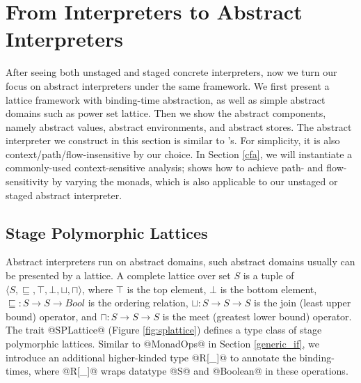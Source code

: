 \section{From Interpreters to Abstract Interpreters} \label{unstaged_abs}

After seeing both unstaged and staged concrete interpreters, now we turn our
focus on abstract interpreters under the same framework. We first present a
lattice framework with binding-time abstraction, as well as simple abstract
domains such as power set lattice.
Then we show the abstract components, namely abstract values, abstract
environments, and abstract stores.
The abstract interpreter we construct in this
section is similar to \citet{DBLP:journals/pacmpl/DaraisLNH17}'s. For
simplicity, it is also context/path/flow-insensitive by our choice. In Section
\ref{cfa}, we will instantiate a commonly-used context-sensitive analysis;
\citet{Darais:2015:GTM:2814270.2814308} shows how to achieve path- and
flow-sensitivity by varying the monads, which is also applicable to our unstaged
or staged abstract interpreter.

\iffalse
For example, the CEK machine \cite{DBLP:conf/popl/FelleisenF87} for
concrete execution can be readily refactored to an effective $0$-CFA
control-flow analysis \cite{Shivers:1988:CFA:53990.54007,
  Midtgaard:2012:CAF:2187671.2187672}: first, tweak the environment
dereference as a nondeterministic choice, such that the environment
may contain multiple possible values for a variable, then allocate
continuations in the environment to exploit return-flow information,
and also constrain the address space to be finite.
\fi

\subsection{Stage Polymorphic Lattices} \label{stagedpoly_lat}

Abstract interpreters run on abstract domains, such abstract domains usually can
be presented by a lattice.
A complete lattice over set $S$ is a tuple of $\langle S, \sqsubseteq, \top,
\bot, \sqcup, \sqcap \rangle$, where $\top$ is the top element, $\bot$ is the
bottom element, $\sqsubseteq : S \to S \to Bool$ is the
ordering relation, $\sqcup: S \to S \to S$ is the join (least upper bound)
operator, and $\sqcap: S \to S \to S$ is the meet (greatest lower bound)
operator. The trait @SPLattice@ (Figure \ref{fig:splattice}) defines a type
class of stage polymorphic lattices. Similar to @MonadOps@ in Section
\ref{generic_if}, we introduce an additional higher-kinded type @R[_]@ to
annotate the binding-times, where @R[_]@ wraps datatype @S@ and @Boolean@ in
these operations.

